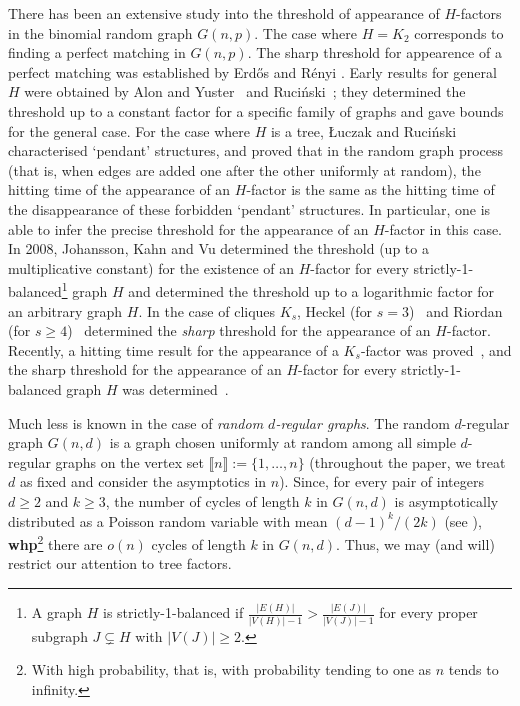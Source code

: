 \documentclass[notitlepage]{scrartcl}
\newcommand{\br}[1]{\llbracket{#1}\rrbracket}
\begin{document}
There has been an extensive study into the threshold of appearance of $H$-factors in the binomial random graph $G(n,p)$. The case where $H = K_2$ corresponds to finding a perfect matching in $G(n, p)$. The sharp threshold for appearence of a perfect matching was established by Erd\H{o}s and R\'enyi \cite{ER66}. 
Early results for general $H$ were obtained by Alon and Yuster~\cite{alon1993threshold} and Ruci\'nski~\cite{R92}; they determined the threshold up to a constant factor for a specific family of graphs and gave bounds for the general case. For the case where $H$ is a tree, \L{}uczak and Ruci\'nski \cite{LR91} characterised `pendant' structures, and proved that in the random graph process (that is, when edges are added one after the other uniformly at random), the hitting time of the appearance of an $H$-factor is the same as the hitting time of the disappearance of these forbidden `pendant' structures. In particular, one is able to infer the precise threshold for the appearance of an $H$-factor in this case. In 2008, Johansson, Kahn and Vu \cite{johansson2008factors} determined the threshold (up to a multiplicative constant) for the existence of an $H$-factor for every strictly-1-balanced\footnote{A graph $H$ is strictly-1-balanced if $\frac{|E(H)|}{|V(H)| - 1} > \frac{|E(J)|}{|V(J)| - 1}$ for every proper subgraph $J \subsetneq H$ with $|V(J)| \ge 2$.} graph $H$ and determined the threshold up to a logarithmic factor for an arbitrary graph $H$. In the case of cliques $K_s$, Heckel (for $s=3$)~\cite{H21} and Riordan (for $s\ge 4$)~\cite{R22} determined the \textit{sharp} threshold for the appearance of an $H$-factor. Recently, a hitting time result for the appearance of a $K_s$-factor was proved~\cite{HKMP}, and the sharp threshold for the appearance of an $H$-factor for every strictly-1-balanced graph $H$ was determined~\cite{BHKMP}.

Much less is known in the case of \textit{random $d$-regular graphs}. The random $d$-regular graph $G(n,d)$ is a graph chosen uniformly at random among all simple $d$-regular graphs on the vertex set $\br{n}:=\{1,\ldots,n\}$ (throughout the paper, we treat $d$ as fixed and consider the asymptotics in $n$). Since, for every pair of integers $d \ge 2$ and $k \ge 3$, the number of cycles of length $k$ in $G(n, d)$ is asymptotically distributed as a Poisson random variable with mean $(d-1)^k/(2k)$ (see \cite{W81}), \textbf{whp}\footnote{With high probability, that is, with probability tending to one as $n$ tends to infinity.} there are $o(n)$ cycles of length $k$ in $G(n, d)$. Thus, we may (and will) restrict our attention to tree factors.
\end{document}
